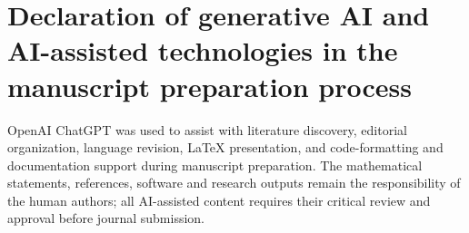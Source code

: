 \section*{Declaration of generative AI and AI-assisted technologies in the manuscript preparation process}
OpenAI ChatGPT was used to assist with literature discovery,
editorial organization, language revision, \LaTeX{} presentation,
and code-formatting and documentation support during manuscript preparation.
The mathematical statements, references, software and research outputs
remain the responsibility of the human authors; all AI-assisted content
requires their critical review and approval before journal submission.
